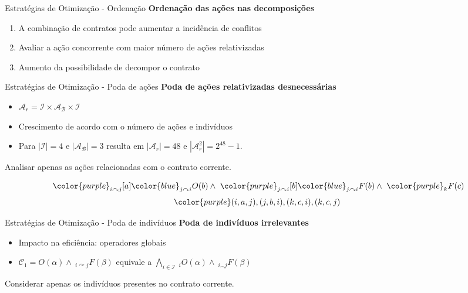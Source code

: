 \begin{frame}{Estratégias de Otimização - Ordenação}
    \textbf{Ordenação das ações nas decomposições}
    \begin{enumerate}
        \item A combinação de contratos pode aumentar a incidência de conflitos
        \item Avaliar a ação concorrente com maior número de ações relativizadas
        \item Aumento da possibilidade de decompor o contrato
    \end{enumerate}
\end{frame}

\begin{frame}{Estratégias de Otimização - Poda de ações}
    \textbf{Poda de ações relativizadas desnecessárias}
    \begin{itemize}
        \item $\mathcal{A}_r = \mathcal{I}\times\mathcal{A_B}\times\mathcal{I}$
        \item Crescimento de acordo com o número de ações e indivíduos
        \item Para $|\mathcal{I}|=4$ e $|\mathcal{A_B}|=3$ resulta em $|\mathcal{A}_r|=48$ e $|\mathcal{A}_r^2|=2^{48}-1$. 
    \end{itemize}
    
    Analisar apenas as ações relacionadas com o contrato corrente.
    
    $$\ {\color{purple} _{i\curvearrowright j}[a]} {\color{blue} _{j\curvearrowright i}O(b)} \wedge \ {\color{purple} _{j\curvearrowright i}[b]} {\color{blue}  _{j\curvearrowright i}F(b)} \wedge \ {\color{purple} _{k}F(c)}$$
    $${\color{purple} (i,a,j), (j,b,i), (k,c,i), (k,c,j)}$$
\end{frame}

\begin{frame}{Estratégias de Otimização - Poda de indivíduos}
    \textbf{Poda de indivíduos irrelevantes}
    \begin{itemize}
        \item Impacto na eficiência: operadores globais
        \item $\mathcal{C}_1 = O(\alpha) \wedge\ _{i\curvearrowright j}F(\beta)$ equivale a $\bigwedge_{i\in\mathcal{I}} \ _iO(\alpha) \wedge\ _{i_\curvearrowright j}F(\beta)$
    \end{itemize}
    
    
    Considerar apenas os indivíduos presentes no contrato corrente.
    
    
\end{frame}



